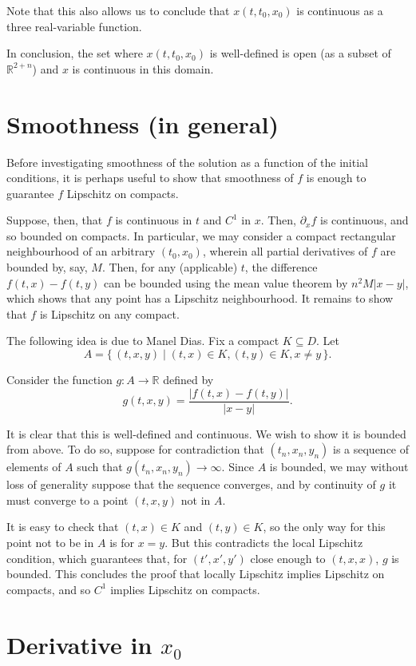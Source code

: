 \documentclass{article}
\newcommand{\R}{\mathbb{R}}
\begin{document}
Note that this also allows us to conclude that $x(t,t_0,x_0)$ is continuous as a three real-variable function.

In conclusion, the set where $x(t,t_0,x_0)$ is well-defined is open (as a subset of $\R^{2+n}$) and $x$ is continuous in this domain.

\section{Smoothness (in general)}

Before investigating smoothness of the solution as a function of the initial conditions, it is perhaps useful to show that smoothness of $f$ is enough to guarantee $f$ Lipschitz on compacts.

Suppose, then, that $f$ is continuous in $t$ and $C^1$ in $x$. Then, $\partial_x f$ is continuous, and so bounded on compacts. In particular, we may consider a compact rectangular neighbourhood of an arbitrary $(t_0, x_0)$, wherein all partial derivatives of $f$ are bounded by, say, $M$. Then, for any (applicable) $t$, the difference $f(t,x) - f(t,y)$ can be bounded using the mean value theorem by $n^2 M \lvert x - y \rvert$, which shows that any point has a Lipschitz neighbourhood. It remains to show that $f$ is Lipschitz on any compact.

The following idea is due to Manel Dias. Fix a compact $K \subseteq D$. Let
\[A = \{\,(t,x,y) \mid (t,x) \in K, (t,y) \in K, x \neq y\,\}.\]

Consider the function $g : A \to \R$ defined by
\[g(t,x,y) = \frac{\lvert f(t,x) - f(t,y) \rvert}{\lvert x-y \rvert}.\]

It is clear that this is well-defined and continuous. We wish to show it is bounded from above. To do so, suppose for contradiction that $(t_n, x_n, y_n)$ is a sequence of elements of $A$ such that $g(t_n, x_n, y_n) \to \infty$. Since $A$ is bounded, we may without loss of generality suppose that the sequence converges, and by continuity of $g$ it must converge to a point $(t,x,y)$ not in $A$.

It is easy to check that $(t,x) \in K$ and $(t,y) \in K$, so the only way for this point not to be in $A$ is for $x = y$. But this contradicts the local Lipschitz condition, which guarantees that, for $(t',x',y')$ close enough to $(t,x,x)$, $g$ is bounded. This concludes the proof that locally Lipschitz implies Lipschitz on compacts, and so $C^1$ implies Lipschitz on compacts.

\section{Derivative in $x_0$}
\end{document}
